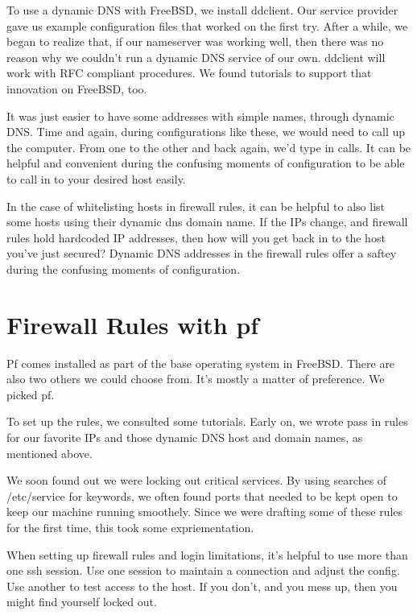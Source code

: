 To use a dynamic DNS with FreeBSD, we install ddclient.  Our service provider gave us example \gls{configuration} files that worked on the first try.  After a while, we began to realize that, if our nameserver was working well, then there was no reason why we couldn't run a dynamic DNS service of our own.  ddclient will work with RFC compliant procedures.  We found tutorials to support that innovation on FreeBSD, too.


It was just easier to have some addresses with simple names, through dynamic DNS.  Time and again, during configurations like these, we would need to call up the computer.  From one to the other and back again, we'd type in calls.  It can be helpful and convenient during the confusing moments of \gls{configuration} to be able to call in to your desired host easily.  

In the case of whitelisting hosts in \gls{firewall} rules, it can be helpful to also list some hosts using their dynamic dns domain name.  If the IPs change, and \gls{firewall} rules hold hardcoded IP addresses, then how will you get back in to the host you've just secured?  Dynamic DNS addresses in the \gls{firewall} rules offer a saftey during the confusing moments of \gls{configuration}.

\section{Firewall Rules with pf}


Pf comes installed as part of the base \gls{operating system} in FreeBSD.  There are also two others we could choose from.  It's mostly a matter of preference.  We picked pf.  

To set up the rules, we consulted some tutorials.  Early on, we wrote pass in rules for our favorite IPs and those dynamic DNS host and domain names, as mentioned above.  

We soon found out we were locking out critical services.  By using searches of /etc/service for keywords, we often found \gls{port}s that needed to be kept open to keep our machine running smoothely.  Since we were drafting some of these rules for the first time, this took some expriementation.  

When setting up \gls{firewall} rules and login limitations, it's helpful to use more than one ssh session.  Use one session to maintain a connection and adjust the config.  Use another to test access to the host.  If you don't, and you mess up, then you might find yourself locked out.  

